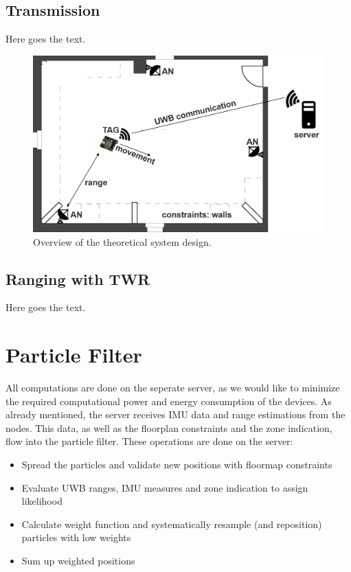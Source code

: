 \subsection{Transmission}
Here goes the text.


\begin{figure}[th]
\centering
\includegraphics[width=1.0\textwidth]{Figures/system_design}
\decoRule
\caption[System Design]{Overview of the theoretical system design.}
\label{fig:system_design}
\end{figure}

\subsection{Ranging with TWR}
Here goes the text.


\section{Particle Filter}
All computations are done on the seperate server, as we would like to minimize the required computational power and energy consumption of the devices. As already mentioned, the server receives IMU data and range estimations from the nodes. This data, as well as the floorplan constraints and the zone indication, flow into the particle filter. These operations are done on the server:
\begin{itemize}
\item Spread the particles and validate new positions with floormap constraints
\item Evaluate UWB ranges, IMU measures and zone indication to assign likelihood
\item Calculate weight function and systematically resample (and reposition) particles with low weights
\item Sum up weighted positions
\end{itemize}

